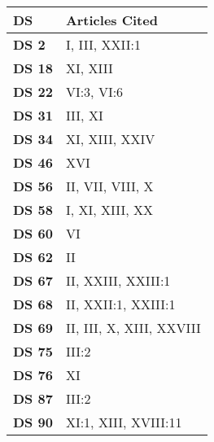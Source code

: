 
\begin{xltabular}{\linewidth}{ l | X }
    \hline 

    \textbf{\normalsize DS} & \textbf{\normalsize Articles Cited}  \\
    \endfirsthead
    \hline \hline

    \textbf {DS 2} & I, III, XXII:1 \\ \hline 

    \textbf {DS 18} & XI, XIII \\ \hline 
    
    \textbf {DS 22} & VI:3, VI:6 \\ \hline 
    
    \textbf {DS 31} & III, XI \\ \hline 
    
    \textbf {DS 34} & XI, XIII, XXIV \\ \hline 
    
    \textbf {DS 46} & XVI \\ \hline 
    
    \textbf {DS 56} & II, VII, VIII, X \\ \hline 
    
    \textbf {DS 58} & I, XI, XIII, XX \\ \hline 
    
    \textbf {DS 60} & VI \\ \hline 
    
    \textbf {DS 62} & II \\ \hline 
    
    \textbf {DS 67} & II, XXIII, XXIII:1 \\ \hline 
    
    \textbf {DS 68} & II, XXII:1, XXIII:1 \\ \hline 
    
    \textbf {DS 69} & II, III, X, XIII, XXVIII \\ \hline 
    
    \textbf {DS 75} & III:2 \\ \hline 
    
    \textbf {DS 76} & XI \\ \hline 
    
    \textbf {DS 87} & III:2 \\ \hline 
    
    \textbf {DS 90} & XI:1, XIII, XVIII:11 \\ \hline 
    

\end{xltabular}
